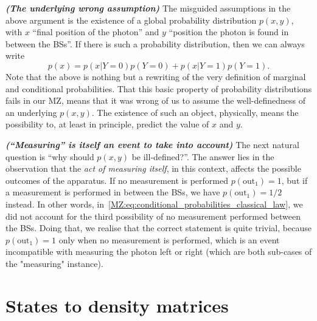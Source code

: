 \documentclass[12pt]{report}
\newcommand{\heading}[1]{\textbf{\color{orange}\textit{(#1)}}}
\begin{document}
\heading{The underlying wrong assumption}
The misguided assumptions in the above argument is the existence of a global probability distribution $p(x,y)$, with $x$ ``final position of the photon'' and $y$ ``position the photon is found in between the BSs''.
If there is such a probability distribution, then we can always write
\begin{equation}
	p(x) = p(x|Y=0) p(Y=0) + p(x|Y=1) p(Y=1).
\end{equation}
Note that the above is nothing but a rewriting of the very definition of marginal and conditional probabilities.
That this basic property of probability distributions fails in our MZ, means that it was wrong of us to assume the well-definedness of an underlying $p(x,y)$.
The existence of such an object, physically, means the possibility to, at least in principle, predict the value of $x$ and $y$.

\heading{``Measuring'' is itself an event to take into account}
The next natural question is ``why should $p(x,y)$ be ill-defined?''.
The answer lies in the observation that the \emph{act of measuring itself}, in this context, affects the possible outcomes of the apparatus. If no measurement is performed $p(\text{out}_1)=1$, but if a measurement is performed in between the BSs, we have $p(\text{out}_1)=1/2$ instead.
In other words, in~\cref{MZ:eq:conditional_probabilities_classical_law}, we did not account for the third possibility of no measurement performed between the BSs.
Doing that, we realise that the correct statement is quite trivial, because $p(\text{out}_1)=1$ only when no measurement is performed, which is an event incompatible with measuring the photon left or right (which are both sub-cases of the "measuring" instance).


\section{States to density matrices}
\end{document}
